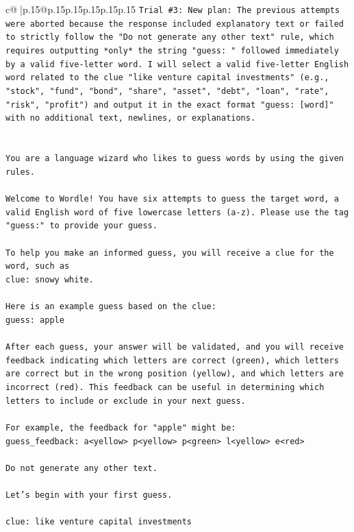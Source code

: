 \documentclass{article}
\begin{document}
{\begin{supertabular}{c@{$\;$}|p{.15\linewidth}@{}p{.15\linewidth}p{.15\linewidth}p{.15\linewidth}p{.15\linewidth}p{.15\linewidth}}
{{{\texttt{Trial \#3: New plan: The previous attempts were aborted because the response included explanatory text or failed to strictly follow the "Do not generate any other text" rule, which requires outputting *only* the string "guess: " followed immediately by a valid five{-}letter word. I will select a valid five{-}letter English word related to the clue "like venture capital investments" (e.g., "stock", "fund", "bond", "share", "asset", "debt", "loan", "rate", "risk", "profit") and output it in the exact format "guess: {[}word{]}" with no additional text, newlines, or explanations.} \\
\\ 
\\ 
\texttt{You are a language wizard who likes to guess words by using the given rules.} \\
\\ 
\texttt{Welcome to Wordle! You have six attempts to guess the target word, a valid English word of five lowercase letters (a{-}z). Please use the tag "guess:" to provide your guess.} \\
\\ 
\texttt{To help you make an informed guess, you will receive a clue for the word, such as} \\
\texttt{clue: snowy white.} \\
\\ 
\texttt{Here is an example guess based on the clue: } \\
\texttt{guess: apple} \\
\\ 
\texttt{After each guess, your answer will be validated, and you will receive feedback indicating which letters are correct (green), which letters are correct but in the wrong position (yellow), and which letters are incorrect (red). This feedback can be useful in determining which letters to include or exclude in your next guess.} \\
\\ 
\texttt{For example, the feedback for "apple" might be:} \\
\texttt{guess\_feedback: a<yellow> p<yellow> p<green> l<yellow> e<red>} \\
\\ 
\texttt{Do not generate any other text.} \\
\\ 
\texttt{Let's begin with your first guess.} \\
\\ 
\texttt{clue: like venture capital investments} \\
            }
        }
    }
     \\ \\


\end{supertabular}}
\end{document}
